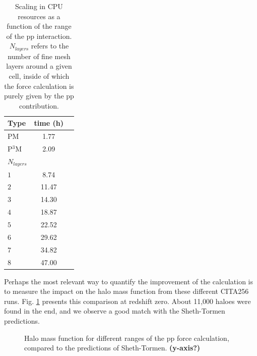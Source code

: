 \begin{table}
\begin{center}
\caption{Scaling in {\small CPU} resources as a function of the range of the pp interaction.
$N_{layers}$ refers to the number of fine mesh layers around a given cell, inside of which the force calculation
is purely given by the pp contribution. }
\begin{tabular}{|l|c|c|}
\hline 
             Type         & time (h)   \\
                  \hline
PM                         & 1.77 \\
P$^{3}$M             & 2.09 \\
\hline
$N_{layers}$       &          \\
\hline
 $1$ & 8.74 \\
 $2$ & 11.47\\
 $3$ & 14.30 \\
 $4$ & 18.87\\
 $5$ & 22.52\\
 $6$ & 29.62\\
 $7$ & 34.82\\
 $8$ & 47.00\\
 

\hline \hline
\end{tabular}
\label{table:cpu_pp_ext}
\end{center}
\end{table}

Perhaps the most relevant way to quantify the improvement of the calculation is to measure the impact on the halo mass function from these different CITA256 runs. Fig. \ref{fig:MassFunction_extpp} presents this comparison at redshift zero. About 11,000 haloes were found in the end, and we observe a good match with the Sheth-Tormen predictions. 

\begin{figure}
  \begin{center}
  \caption{ Halo mass function for different ranges of the pp force calculation, compared to the predictions of Sheth-Tormen. {\bf (y-axis?)}}
    \label{fig:MassFunction_extpp}
  \end{center}
\end{figure}

